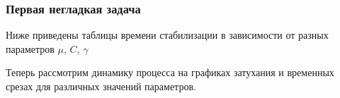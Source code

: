 \subsubsection{Первая негладкая задача}
Ниже приведены таблицы времени стабилизации в зависимости от разных параметров $\mu$, $C$, $\gamma$

\newpage




\newpage




\newpage
Теперь рассмотрим динамику процесса на графиках затухания и временных срезах для различных значений параметров. 

